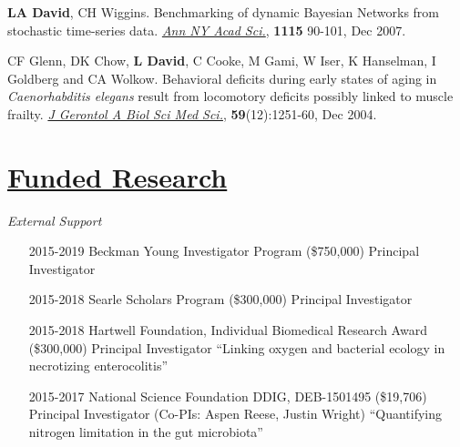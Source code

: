 \documentclass[overlapped,line,11pt]{res}
\begin{document}
\begin{resume}
\begin{revnumerate}[17]
\vspace*{1mm}
\item {\textbf{LA David}, CH Wiggins. Benchmarking of dynamic Bayesian
  Networks from stochastic time-series data. \emph{\underline{Ann NY Acad Sci.}},
  \textbf{1115} 90-101, Dec 2007.}

\vspace*{1mm}
\item {CF Glenn, DK Chow, \textbf{L David}, C Cooke, M Gami, W Iser, K
  Hanselman, I Goldberg and CA Wolkow. Behavioral deficits during
  early states of aging in {\em Caenorhabditis elegans} result from
  locomotory deficits possibly linked to muscle frailty. \emph{\underline{J
    Gerontol A Biol Sci Med Sci.}}, \textbf{59}(12):1251-60, Dec 2004.}
\end{revnumerate}

\section{\underline{\sc Funded Research}} 
\vspace{.1in}
\emph{External Support}
\vspace{.1in}

\begin{itemize}[leftmargin=2cm, style=sameline]

\item[2015-2019] Beckman Young Investigator Program (\$750,000) \newline Principal Investigator 

\item[2015-2018] Searle Scholars Program (\$300,000) \newline Principal Investigator 
  
\item[2015-2018] Hartwell Foundation, Individual Biomedical Research Award (\$300,000) \newline Principal Investigator 
  \newline ``Linking oxygen and bacterial ecology in necrotizing enterocolitis''

\item[2015-2017] National Science Foundation DDIG, DEB-1501495 (\$19,706) \newline Principal Investigator (Co-PIs: Aspen Reese, Justin Wright) 
  \newline ``Quantifying nitrogen limitation in the gut microbiota''


\end{itemize}
\end{resume}
\end{document}
